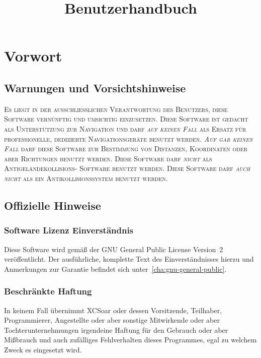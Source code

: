 \documentclass[german,a4paper,11pt]{refrep}
\title{Benutzerhandbuch}%
\begin{document}
\sloppy%
%
\maketitle
\begingroup\setlength{\parskip}{0.1\baselineskip}\tableofcontents\endgroup
\chapter*{Vorwort}
\section*{Warnungen und Vorsichtshinweise}
%
\warning
\textsc{Es liegt in der ausschließlichen Verantwortung des Benutzers, diese Software vernünftig
und umsichtig einzusetzen. Diese Software ist gedacht als Unterstützung zur Navigation
und darf \emph{auf keinen Fall} als Ersatz für professionelle, dedizierte Navigationsgeräte benutzt
werden. \emph{Auf gar keinen Fall} darf diese Software zur Bestimmung von Distanzen, Koordinaten
oder aber Richtungen benutzt werden. Diese Software darf \emph{nicht} als Antigeländekollisions- Software benutzt werden.
Diese Software darf \emph{auch nicht} als ein Antikollisionssystem benutzt werden.}
%
\section*{Offizielle Hinweise}
\subsection*{Software Lizenz Einverständnis}
%
Diese Software wird gemäß der GNU General Public License Version~2 veröffentlicht. Der ausführliche,
komplette Text des Einverständnisses hierzu und Anmerkungen zur Garantie befindet sich
unter~\ref{cha:gnu-general-public}.
%
\subsection*{Beschränkte Haftung}
In keinem Fall übernimmt XCSoar oder dessen Vorsitzende, Teilhaber, Programmierer, Angestellte  oder aber sonstige Mitwirkende  oder aber  Tochterunternehmungen irgendeine Haftung für den Gebrauch oder aber Mißbrauch und auch zufälliges Fehlverhalten dieses Programmes, egal zu welchem Zweck es eingesetzt wird.
%
\end{document}
